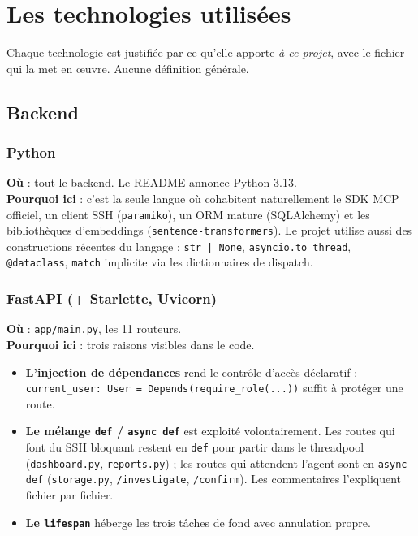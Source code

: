 \documentclass[11pt,a4paper]{report}
\newcommand{\file}[1]{\texttt{\small #1}}
\newcommand{\fn}[1]{\texttt{\small\textcolor{oasisviolet}{#1}}}
\newcommand{\route}[1]{\texttt{\small\textcolor{oasisgreen}{#1}}}
\begin{document}
\chapter{Les technologies utilisées}
\label{ch:technos}

Chaque technologie est justifiée par ce qu'elle apporte \emph{à ce projet},
avec le fichier qui la met en œuvre. Aucune définition générale.

\section{Backend}

\subsection{Python}
\textbf{Où} : tout le backend. Le README annonce Python 3.13.\\
\textbf{Pourquoi ici} : c'est la seule langue où cohabitent naturellement le SDK
MCP officiel, un client SSH (\texttt{paramiko}), un ORM mature (SQLAlchemy) et
les bibliothèques d'embeddings (\texttt{sentence-transformers}). Le projet
utilise aussi des constructions récentes du langage : \texttt{str | None},
\texttt{asyncio.to\_thread}, \texttt{@dataclass}, \texttt{match} implicite via
les dictionnaires de dispatch.

\subsection{FastAPI (+ Starlette, Uvicorn)}
\textbf{Où} : \file{app/main.py}, les 11 routeurs.\\
\textbf{Pourquoi ici} : trois raisons visibles dans le code.
\begin{itemize}
  \item \textbf{L'injection de dépendances} rend le contrôle d'accès
  déclaratif : \texttt{current\_user: User = Depends(require\_role(...))} suffit
  à protéger une route.
  \item \textbf{Le mélange \texttt{def} / \texttt{async def}} est exploité
  volontairement. Les routes qui font du SSH bloquant restent en \texttt{def}
  pour partir dans le threadpool (\file{dashboard.py}, \file{reports.py}) ; les
  routes qui attendent l'agent sont en \texttt{async def} (\file{storage.py},
  \route{/investigate}, \route{/confirm}). Les commentaires l'expliquent
  fichier par fichier.
  \item \textbf{Le \fn{lifespan}} héberge les trois tâches de fond avec
  annulation propre.
\end{itemize}
\end{document}
